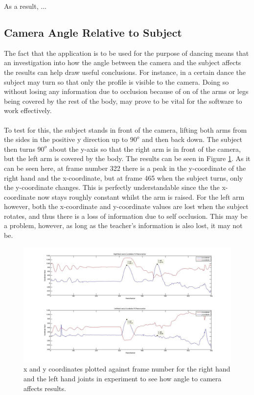 \documentclass[10pt]{article}
\begin{document}
As a result, ... %

\subsection{Camera Angle Relative to Subject}
\noindent 
The fact that the application is to be used for the purpose of dancing means that an investigation into how the angle between the camera and the subject affects the results can help draw useful conclusions. For instance, in a certain dance the subject may turn so that only the profile is visible to the camera. Doing so without losing any information due to occlusion because of on of the arms or legs being covered by the rest of the body, may prove to be vital for the software to work effectively. 
\\\\
\noindent
To test for this, the subject stands in front of the camera, lifting both arms from the sides in the positive y direction up to $90^o$ and then back down. The subject then turns $90^o$ about the y-axis so that the right arm is in front of the camera, but the left arm is covered by the body. The results can be seen in Figure \ref{angle_camera}. As it can be seen here, at frame number 322 there is a peak in the y-coordinate of the right hand and the x-coordinate, but at frame 465 when the subject turns, only the y-coordinate changes. This is perfectly understandable since the the x-coordinate now stays roughly constant whilst the arm is raised. For the left arm however, both the x-coordinate and y-coordinate values are lost when the subject rotates, and thus there is a loss of information due to self occlusion. This may be a problem, however, as long as the teacher's information is also lost, it may not be.  
\begin{figure}[H]
\centering
\includegraphics[scale=0.3]{Angle_To_Camera.jpg}
\caption{x and y coordinates plotted against frame number for the right hand and the left hand joints in experiment to see how angle to camera affects results.}
\label{angle_camera}
\end{figure}
 
\end{document}
